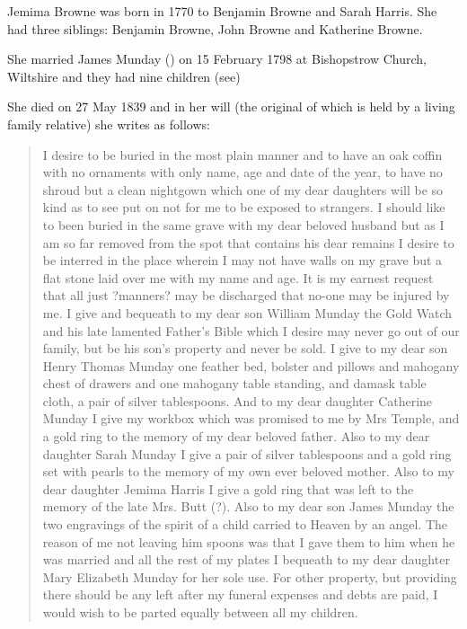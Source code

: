
Jemima Browne was born in	1770 to Benjamin Browne and Sarah Harris. She had three siblings: Benjamin Browne, John Browne and Katherine Browne.

She married James Munday () on 15 February 1798 at Bishopstrow Church, Wiltshire and they had nine children (see)

She died on 27 May 1839 and in her will (the original of which is held by a living family relative) she writes as follows:

\begin{quotation}
I desire to be buried in the most plain manner and to have an oak coffin with no ornaments with only name, age and date of the year, to have no shroud but a clean nightgown which one of my dear daughters will be so kind as to see put on not for me to be exposed to strangers. I should like to been buried in the same grave with my dear beloved husband but as I am so far removed from the spot that contains his dear remains I desire to be interred in the place wherein I may not have walls on my grave but a flat stone laid over me with my name and age. It is my earnest request that all just ?manners? may be discharged that no-one may be injured by me. I give and bequeath to my dear son William Munday the Gold Watch and his late lamented Father's Bible which I desire may never go out of our family, but be his son's property and never be sold. I give to my dear son Henry Thomas Munday one feather bed, bolster and pillows and mahogany chest of drawers and one mahogany table standing, and damask table cloth, a pair of silver tablespoons. And to my dear daughter Catherine Munday I give my workbox which was promised to me by Mrs Temple, and a gold ring to the memory of my dear beloved father. Also to my dear daughter Sarah Munday I give a pair of silver tablespoons and a gold ring set with pearls to the memory of my own ever beloved mother. Also to my dear daughter Jemima Harris I give a gold ring that was left to the memory of the late Mrs. Butt (?). Also to my dear son James Munday the two engravings of the spirit of a child carried to Heaven by an angel. The reason of me not leaving him spoons was that I gave them to him when he was married and all the rest of my plates I bequeath to my dear daughter Mary Elizabeth Munday for her sole use. For other property, but providing there should be any left after my funeral expenses and debts are paid, I would wish to be parted equally between all my children.
\end{quotation}
